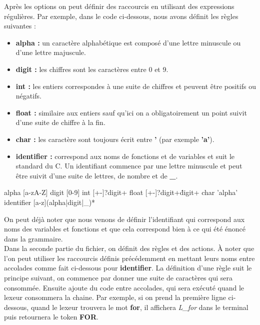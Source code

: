 \documentclass[a4paper]{article}%
\begin{document}
Après les options on peut définir des raccourcis en utilisant des expressions
régulières. Par exemple, dans le code ci-dessous, nous avons définit les règles
suivantes :

\begin{itemize}
  \item \textbf{alpha :} un caractère alphabétique est composé d'une lettre
    minuscule ou d'une lettre majuscule.
  \item \textbf{digit :} les chiffres sont les caractères entre 0 et 9.
  \item \textbf{int :} les entiers correspondes à une suite de chiffres et
    peuvent être positifs ou négatifs.
  \item \textbf{float :} similaire aux entiers sauf qu'ici on a obligatoirement
    un point suivit d'une suite de chiffre à la fin.
  \item \textbf{char :} les caractère sont toujours écrit entre \textbf{'} (par
    exemple \textbf{'a'}).
  \item \textbf{identifier :} correspond aux noms de fonctions et de variables
    et suit le standard du C. Un identifiant commence par une lettre minuscule
    et peut être suivit d'une suite de lettres, de nombre et de \textbf{\_}.
\end{itemize}

\begin{code}
alpha [a-zA-Z]
digit [0-9]
int [+-]?{digit}+
float [+-]?{digit}+\.{digit}+
char '{alpha}'
identifier [a-z]({alpha}|{digit}|_)*
\end{code}\leavevmode\newline

\noindent

On peut déjà noter que nous venons de définir l'identifiant qui correspond aux
noms des variables et fonctions et que cela correspond bien à ce qui été énoncé
dans la grammaire.\\

Dans la seconde partie du fichier, on définit des règles et des actions. À noter
que l'on peut utiliser les raccourcis définis précédemment en mettant leurs noms
entre accolades comme fait ci-dessous pour \textbf{identifier}. La définition
d'une règle suit le principe suivant, on commence par donner une suite de
caractères qui sera consommée. Ensuite ajoute du code entre accolades, qui
sera exécuté quand le lexeur consommera la chaine. Par exemple, si on prend la
première ligne ci-dessous, quand le lexeur trouvera le mot \textbf{for}, il
affichera \textit{L\_for} dans le terminal puis retournera le token \textbf{FOR}.
\end{document}
